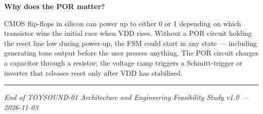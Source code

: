 \documentclass[11pt,a4paper]{article}
\begin{document}
\textbf{Why does the POR matter?}

CMOS flip-flops in silicon can power up to either 0 or 1 depending on which transistor wins
the initial race when VDD rises. Without a POR circuit holding the reset line low during power-up,
the FSM could start in any state --- including generating tone output before the user presses
anything. The POR circuit charges a capacitor through a resistor; the voltage ramp triggers a
Schmitt-trigger or inverter that releases reset only after VDD has stabilised.

\vspace{1em}
\hrule
\vspace{0.5em}
{\small\textit{End of TOYSOUND-01 Architecture and Engineering Feasibility Study v1.0 --- 2026-11-03}}
\end{document}
